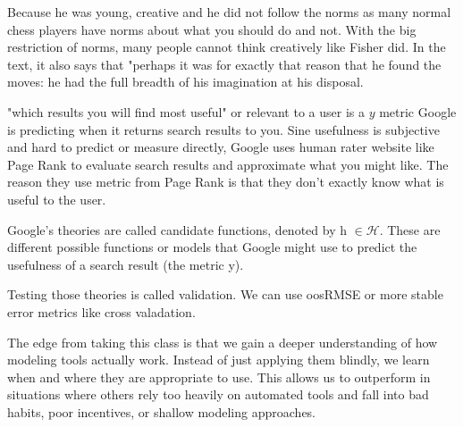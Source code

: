 \documentclass[12pt]{article}
\begin{document}
\begin{enumerate}

Because he was young, creative and he did not follow the norms as many normal chess players have norms about what you should do and not. With the big restriction of norms, many people cannot think creatively like Fisher did. In the text, it also says that "perhaps it was for exactly that reason that he found the moves: he had the full breadth of his imagination at his disposal.


"which results you will find most useful" or relevant to a user is a $y$ metric Google is predicting when it returns search results to you. Sine usefulness is subjective and hard to predict or measure directly, Google uses human rater website like Page Rank to evaluate search results and approximate what you might like. The reason they use metric from Page Rank is that they don't exactly know what is useful to the user.



Google’s theories are called candidate functions, denoted by h $\in $$\mathcal{H}$. These are different possible functions or models that Google might use to predict the usefulness of a search result (the metric y). 

Testing those theories is called validation. We can use oosRMSE or more stable error metrics like cross valadation.


The edge from taking this class is that we gain a deeper understanding of how modeling tools actually work. Instead of just applying them blindly, we learn when and where they are appropriate to use. This allows us to outperform in situations where others rely too heavily on automated tools and fall into bad habits, poor incentives, or shallow modeling approaches.



\end{enumerate}
\end{document}
